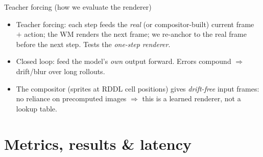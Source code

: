 \documentclass[aspectratio=169,11pt]{beamer}
\newcommand{\good}[1]{\textcolor{good}{#1}}
\newcommand{\bad}[1]{\textcolor{acc}{#1}}
\begin{document}
\begin{frame}{Teacher forcing (how we evaluate the renderer)}
  \centering
  \vspace{0.6em}
  \begin{itemize}\small
    \item \good{Teacher forcing}: each step feeds the \emph{real} (or compositor-built)
          current frame $+$ action; the WM renders the next frame; we re-anchor to
          the real frame before the next step. Tests the \emph{one-step renderer}.
    \item \bad{Closed loop}: feed the model's \emph{own} output forward. Errors
          compound $\Rightarrow$ drift/blur over long rollouts.
    \item The compositor (sprites at RDDL cell positions) gives \emph{drift-free}
          input frames: no reliance on precomputed images $\Rightarrow$ this is a
          learned renderer, not a lookup table.
  \end{itemize}
\end{frame}

%
\section{Metrics, results \& latency}
\end{document}

